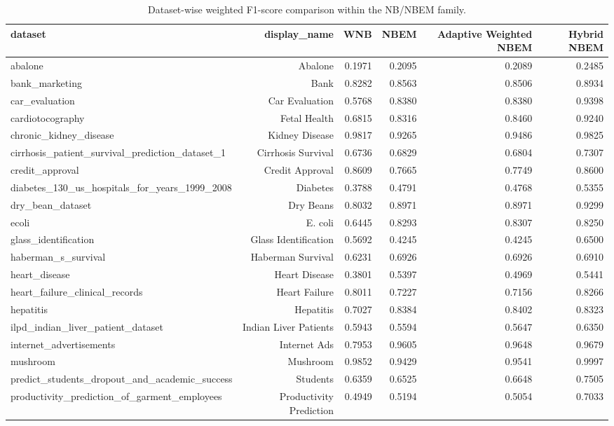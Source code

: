 \begin{table}[!htbp]
\centering
\scriptsize
\caption{Dataset-wise weighted F1-score comparison within the NB/NBEM family.}
\label{tab:dataset_weighted_f1}
\begin{adjustbox}{max width=\textwidth}
\begin{tabular}{lrrrrr}
\toprule
dataset & display\_name & WNB & NBEM & Adaptive Weighted NBEM & Hybrid NBEM \\
\midrule
abalone & Abalone & 0.1971 & 0.2095 & 0.2089 & 0.2485 \\
bank\_marketing & Bank & 0.8282 & 0.8563 & 0.8506 & 0.8934 \\
car\_evaluation & Car Evaluation & 0.5768 & 0.8380 & 0.8380 & 0.9398 \\
cardiotocography & Fetal Health & 0.6815 & 0.8316 & 0.8460 & 0.9240 \\
chronic\_kidney\_disease & Kidney Disease & 0.9817 & 0.9265 & 0.9486 & 0.9825 \\
cirrhosis\_patient\_survival\_prediction\_dataset\_1 & Cirrhosis Survival & 0.6736 & 0.6829 & 0.6804 & 0.7307 \\
credit\_approval & Credit Approval & 0.8609 & 0.7665 & 0.7749 & 0.8600 \\
diabetes\_130\_us\_hospitals\_for\_years\_1999\_2008 & Diabetes & 0.3788 & 0.4791 & 0.4768 & 0.5355 \\
dry\_bean\_dataset & Dry Beans & 0.8032 & 0.8971 & 0.8971 & 0.9299 \\
ecoli & E. coli & 0.6445 & 0.8293 & 0.8307 & 0.8250 \\
glass\_identification & Glass Identification & 0.5692 & 0.4245 & 0.4245 & 0.6500 \\
haberman\_s\_survival & Haberman Survival & 0.6231 & 0.6926 & 0.6926 & 0.6910 \\
heart\_disease & Heart Disease & 0.3801 & 0.5397 & 0.4969 & 0.5441 \\
heart\_failure\_clinical\_records & Heart Failure & 0.8011 & 0.7227 & 0.7156 & 0.8266 \\
hepatitis & Hepatitis & 0.7027 & 0.8384 & 0.8402 & 0.8323 \\
ilpd\_indian\_liver\_patient\_dataset & Indian Liver Patients & 0.5943 & 0.5594 & 0.5647 & 0.6350 \\
internet\_advertisements & Internet Ads & 0.7953 & 0.9605 & 0.9648 & 0.9679 \\
mushroom & Mushroom & 0.9852 & 0.9429 & 0.9541 & 0.9997 \\
predict\_students\_dropout\_and\_academic\_success & Students & 0.6359 & 0.6525 & 0.6648 & 0.7505 \\
productivity\_prediction\_of\_garment\_employees & Productivity Prediction & 0.4949 & 0.5194 & 0.5054 & 0.7033 \\
\bottomrule
\end{tabular}
\end{adjustbox}
\end{table}
